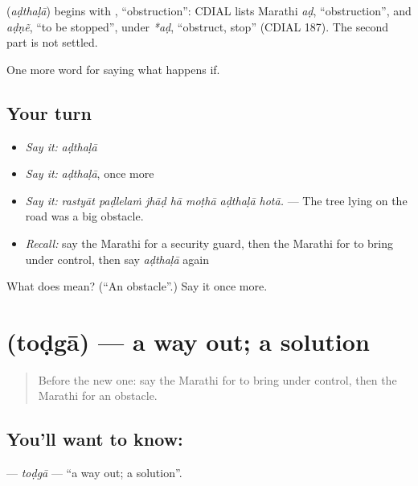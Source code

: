 \begin{cousinweb}
\textbf{} (\emph{aḍthaḷā}) begins with , \textquotedblleft{}obstruction\textquotedblright{}: CDIAL lists Marathi \emph{aḍ}, \textquotedblleft{}obstruction\textquotedblright{}, and \emph{aḍṇẽ}, \textquotedblleft{}to be stopped\textquotedblright{}, under \emph{*aḍ}, \textquotedblleft{}obstruct, stop\textquotedblright{} (CDIAL 187). The second part is not settled.
\end{cousinweb}

\begin{grammarlens}[title={What you've built}]
One more word for saying what happens if.
\end{grammarlens}

\subsection*{Your turn}
\begin{itemize}
\raggedright
  \item \emph{Say it:} \emph{aḍthaḷā}
  \item \emph{Say it:} \emph{aḍthaḷā}, once more
  \item \emph{Say it:} \emph{rastyāt paḍlelaṁ jhāḍ hā moṭhā aḍthaḷā hotā.} — The tree lying on the road was a big obstacle.
  \item \emph{Recall:} say the Marathi for a security guard, then the Marathi for to bring under control, then say \emph{aḍthaḷā} again
\end{itemize}

\begin{tcolorbox}[breakable,colback=teal!4,colframe=teal!35!black,title={Before you move on}]
What does  mean? (\textquotedblleft{}An obstacle\textquotedblright{}.) Say it once more.
\end{tcolorbox}
\section[\texorpdfstring{\mr{तोडगा} (toḍgā)}{तोडगा (toḍgā)}]{ (toḍgā) — a way out; a solution}

\label{lesson:MR-C548-todga}



\begin{quote}
Before the new one: say the Marathi for to bring under control, then the Marathi for an obstacle.
\end{quote}

\subsection*{You'll want to know: }
\textbf{} — \emph{toḍgā} — \textquotedblleft{}a way out; a solution\textquotedblright{}.

